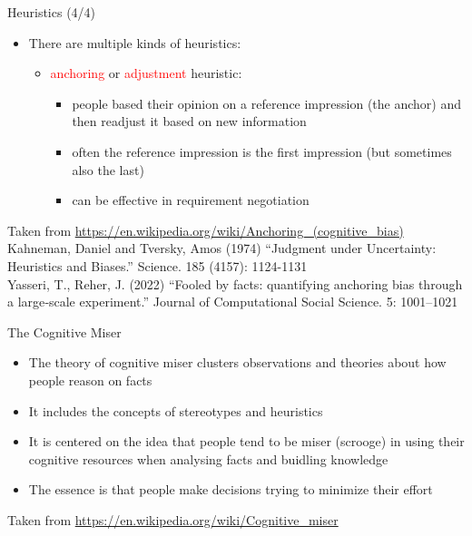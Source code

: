 \documentclass{beamer}
\begin{document}
\begin{frame}
{\centerline{Heuristics (4/4)}}
\begin{itemize}
    \item There are multiple kinds of heuristics:
                 \begin{itemize}
        \item \textcolor{red}{anchoring} or \textcolor{red}{adjustment} heuristic:
             \begin{itemize}
                       \item people based their opinion on a reference impression (the anchor) and then readjust it based on new information
                       \item often the reference impression is the first impression (but sometimes also the last)
                       \item can be effective in requirement negotiation
             \end{itemize} 
   \end{itemize} 
\end{itemize} 
\begin{center}
    \tiny{Taken from \url{https://en.wikipedia.org/wiki/Anchoring_(cognitive_bias)} \\Kahneman, Daniel and Tversky, Amos (1974) ``Judgment under Uncertainty: Heuristics and Biases.'' Science. 185 (4157): 1124-1131\\
    Yasseri, T., Reher, J. (2022) ``Fooled by facts: quantifying anchoring bias through a large‐scale experiment.'' Journal of Computational Social Science. 5: 1001–1021}
\end{center}

\end{frame}



\begin{frame}
{\centerline{The Cognitive Miser}}
\begin{itemize}
    \item The theory of cognitive miser clusters observations and theories about how people reason on facts
    \item It includes the concepts of stereotypes and heuristics
    \item It is centered on the idea that people tend to be miser (scrooge) in using their cognitive resources when analysing facts and buidling knowledge
    \item The essence is that people make decisions trying to minimize their effort
\end{itemize} 
\begin{center}
    \tiny{Taken from \url{https://en.wikipedia.org/wiki/Cognitive_miser}}
\end{center}

\end{frame}
\end{document}
